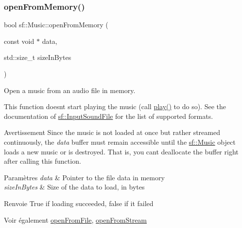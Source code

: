 \subsubsection{\texorpdfstring{open\+From\+Memory()}{openFromMemory()}}
{\footnotesize\ttfamily bool sf\+::\+Music\+::open\+From\+Memory (\begin{DoxyParamCaption}\item[{const void $\ast$}]{data,  }\item[{std\+::size\+\_\+t}]{size\+In\+Bytes }\end{DoxyParamCaption})}



Open a music from an audio file in memory. 

This function doesn\textquotesingle{}t start playing the music (call \hyperlink{classsf_1_1SoundStream_afdc08b69cab5f243d9324940a85a1144}{play()} to do so). See the documentation of \hyperlink{classsf_1_1InputSoundFile}{sf\+::\+Input\+Sound\+File} for the list of supported formats.

\begin{DoxyWarning}{Avertissement}
Since the music is not loaded at once but rather streamed continuously, the {\itshape data} buffer must remain accessible until the \hyperlink{classsf_1_1Music}{sf\+::\+Music} object loads a new music or is destroyed. That is, you can\textquotesingle{}t deallocate the buffer right after calling this function.
\end{DoxyWarning}

\begin{DoxyParams}{Paramètres}
{\em data} & Pointer to the file data in memory \\
\hline
{\em size\+In\+Bytes} & Size of the data to load, in bytes\\
\hline
\end{DoxyParams}
\begin{DoxyReturn}{Renvoie}
True if loading succeeded, false if it failed
\end{DoxyReturn}
\begin{DoxySeeAlso}{Voir également}
\hyperlink{classsf_1_1Music_a3edc66e5f5b3f11e84b90eaec9c7d7c0}{open\+From\+File}, \hyperlink{classsf_1_1Music_a4e55d1910a26858b44778c26b237d673}{open\+From\+Stream} 
\end{DoxySeeAlso}
\mbox{\label{classsf_1_1Music_a4e55d1910a26858b44778c26b237d673}} 
